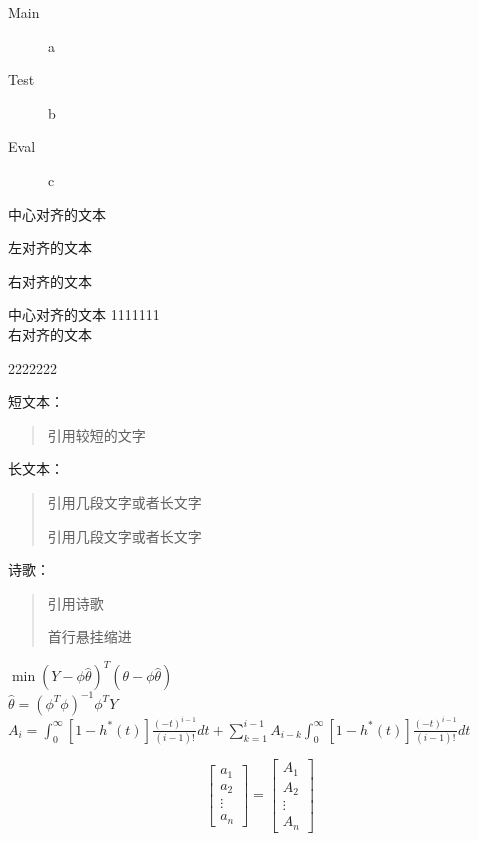 \documentclass{ctexart}
\begin{document}
\begin{description}
\item[Main] a
\item[Test] b
\item[Eval] c  
\end{description}

\begin{center}
    中心对齐的文本
\end{center}

\begin{flushleft}
    左对齐的文本
\end{flushleft}

\begin{flushright}
    右对齐的文本
\end{flushright}

\centering 中心对齐的文本
1111111 \\
\raggedleft
右对齐的文本 \\
\raggedright
2222222 \par
短文本：
\begin{quote}
    引用较短的文字
\end{quote}
长文本：
\begin{quotation}
引用几段文字或者长文字

引用几段文字或者长文字
\end{quotation}
诗歌：
\begin{verse}
    引用诗歌

    首行悬挂缩进

\end{verse}

\begin{center}
    $ \min(Y-\phi\widehat{\theta})^{T}(\theta-\phi\widehat{\theta}) $\\
    $ \widehat{\theta}=(\phi^{T}\phi)^{-1}\phi^{T}Y   $\\
    $ A_i=\int_0^\infty [1-h^{*}(t)]\frac{(-t)^{i-1}}{(i-1)!}dt+\sum_{k=1}^{i-1} A_{i-k} \int_0^\infty [1-h^{*}(t)]\frac{(-t)^{i-1}}{(i-1)!} dt$

\end{center}




\begin{equation*}
\begin{bmatrix}a_1 \\ a_2 \\\vdots \\ a_n\end{bmatrix}=\begin{bmatrix}A_1 \\ A_2 \\\vdots \\ A_n\end{bmatrix}
\end{equation*}
\end{document}
